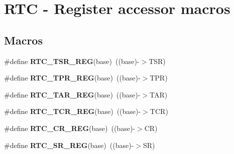 \hypertarget{group__RTC__Register__Accessor__Macros}{}\section{R\+TC -\/ Register accessor macros}
\label{group__RTC__Register__Accessor__Macros}
\subsection*{Macros}
\begin{DoxyCompactItemize}
\item 
\#define {\bfseries R\+T\+C\+\_\+\+T\+S\+R\+\_\+\+R\+EG}(base)~((base)-\/$>$T\+SR)\hypertarget{group__RTC__Register__Accessor__Macros_ga8e35afa52e674ff535ecc57472498ca8}{}\label{group__RTC__Register__Accessor__Macros_ga8e35afa52e674ff535ecc57472498ca8}

\item 
\#define {\bfseries R\+T\+C\+\_\+\+T\+P\+R\+\_\+\+R\+EG}(base)~((base)-\/$>$T\+PR)\hypertarget{group__RTC__Register__Accessor__Macros_gac08a2bfcaf64e65e8192ea268057da7c}{}\label{group__RTC__Register__Accessor__Macros_gac08a2bfcaf64e65e8192ea268057da7c}

\item 
\#define {\bfseries R\+T\+C\+\_\+\+T\+A\+R\+\_\+\+R\+EG}(base)~((base)-\/$>$T\+AR)\hypertarget{group__RTC__Register__Accessor__Macros_ga161cb8068d36702819a6097fa4716025}{}\label{group__RTC__Register__Accessor__Macros_ga161cb8068d36702819a6097fa4716025}

\item 
\#define {\bfseries R\+T\+C\+\_\+\+T\+C\+R\+\_\+\+R\+EG}(base)~((base)-\/$>$T\+CR)\hypertarget{group__RTC__Register__Accessor__Macros_ga4659f1e235bf0cbc0ec63c689645761b}{}\label{group__RTC__Register__Accessor__Macros_ga4659f1e235bf0cbc0ec63c689645761b}

\item 
\#define {\bfseries R\+T\+C\+\_\+\+C\+R\+\_\+\+R\+EG}(base)~((base)-\/$>$CR)\hypertarget{group__RTC__Register__Accessor__Macros_ga32aa9fd38e099ee1a01f094e5389a794}{}\label{group__RTC__Register__Accessor__Macros_ga32aa9fd38e099ee1a01f094e5389a794}

\item 
\#define {\bfseries R\+T\+C\+\_\+\+S\+R\+\_\+\+R\+EG}(base)~((base)-\/$>$SR)\hypertarget{group__RTC__Register__Accessor__Macros_gab87ebfc55a2b4e49ef0c0a52819e27b0}{}\label{group__RTC__Register__Accessor__Macros_gab87ebfc55a2b4e49ef0c0a52819e27b0}


\end{DoxyCompactItemize}
